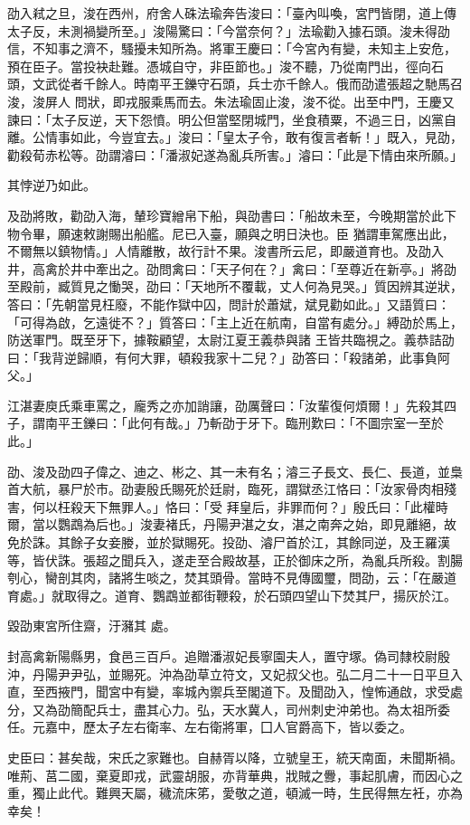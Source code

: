 \begin{pinyinscope}
 劭入弒之旦，浚在西州，府舍人硃法瑜奔告浚曰：「臺內叫喚，宮門皆閉，道上傳太子反，未測禍變所至。」浚陽驚曰：「今當奈何？」法瑜勸入據石頭。浚未得劭信，不知事之濟不，騷擾未知所為。將軍王慶曰：「今宮內有變，未知主上安危，預在臣子。當投袂赴難。憑城自守，非臣節也。」浚不聽，乃從南門出，徑向石頭，文武從者千餘人。時南平王鑠守石頭，兵士亦千餘人。俄而劭遣張超之馳馬召浚，浚屏人
 問狀，即戎服乘馬而去。朱法瑜固止浚，浚不從。出至中門，王慶又諫曰：「太子反逆，天下怨憤。明公但當堅閉城門，坐食積粟，不過三日，凶黨自離。公情事如此，今豈宜去。」浚曰：「皇太子令，敢有復言者斬！」既入，見劭，勸殺荀赤松等。劭謂濬曰：「潘淑妃遂為亂兵所害。」濬曰：「此是下情由來所願。」



 其悖逆乃如此。



 及劭將敗，勸劭入海，輦珍寶繒帛下船，與劭書曰：「船故未至，今晚期當於此下物令畢，願速敕謝賜出船艦。尼已入臺，願與之明日決也。臣
 猶謂車駕應出此，不爾無以鎮物情。」人情離散，故行計不果。浚書所云尼，即嚴道育也。及劭入井，高禽於井中牽出之。劭問禽曰：「天子何在？」禽曰：「至尊近在新亭。」將劭至殿前，臧質見之慟哭，劭曰：「天地所不覆載，丈人何為見哭。」質因辨其逆狀，答曰：「先朝當見枉廢，不能作獄中囚，問計於蕭斌，斌見勸如此。」又語質曰：「可得為啟，乞遠徙不？」質答曰：「主上近在航南，自當有處分。」縛劭於馬上，防送軍門。既至牙下，據鞍顧望，太尉江夏王義恭與諸
 王皆共臨視之。義恭詰劭曰：「我背逆歸順，有何大罪，頓殺我家十二兒？」劭答曰：「殺諸弟，此事負阿父。」



 江湛妻庾氏乘車罵之，龐秀之亦加誚讓，劭厲聲曰：「汝輩復何煩爾！」先殺其四子，謂南平王鑠曰：「此何有哉。」乃斬劭于牙下。臨刑歎曰：「不圖宗室一至於此。」



 劭、浚及劭四子偉之、迪之、彬之、其一未有名；濬三子長文、長仁、長道，並梟首大航，暴尸於市。劭妻殷氏賜死於廷尉，臨死，謂獄丞江恪曰：「汝家骨肉相殘害，何以枉殺天下無罪人。」恪曰：「受
 拜皇后，非罪而何？」殷氏曰：「此權時爾，當以鸚鵡為后也。」浚妻褚氏，丹陽尹湛之女，湛之南奔之始，即見離絕，故免於誅。其餘子女妾媵，並於獄賜死。投劭、濬尸首於江，其餘同逆，及王羅漢等，皆伏誅。張超之聞兵入，遂走至合殿故基，正於御床之所，為亂兵所殺。割腸刳心，臠剖其肉，諸將生啖之，焚其頭骨。當時不見傳國璽，問劭，云：「在嚴道育處。」就取得之。道育、鸚鵡並都街鞭殺，於石頭四望山下焚其尸，揚灰於江。



 毀劭東宮所住齋，汙瀦其
 處。



 封高禽新陽縣男，食邑三百戶。追贈潘淑妃長寧園夫人，置守塚。偽司隸校尉殷沖，丹陽尹尹弘，並賜死。沖為劭草立符文，又妃叔父也。弘二月二十一日平旦入直，至西掖門，聞宮中有變，率城內禦兵至閣道下。及聞劭入，惶怖通啟，求受處分，又為劭簡配兵士，盡其心力。弘，天水冀人，司州刺史沖弟也。為太祖所委任。元嘉中，歷太子左右衛率、左右衛將軍，囗人官爵高下，皆以委之。



 史臣曰：甚矣哉，宋氏之家難也。自赫胥以降，立號皇王，統天南面，未聞斯禍。唯荊、莒二國，棄夏即戎，武靈胡服，亦背華典，戕賊之釁，事起肌膚，而因心之重，獨止此代。難興天屬，穢流床笫，愛敬之道，頓滅一時，生民得無左衽，亦為幸矣！



\end{pinyinscope}